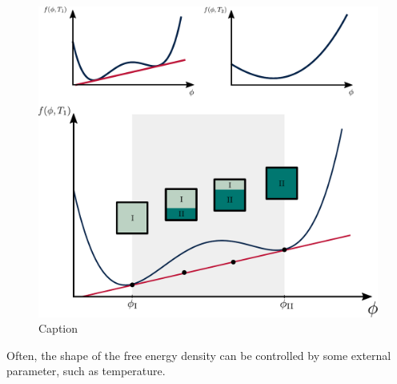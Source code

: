 \begin{figure}
    \centering
    \includegraphics[width=\textwidth]{figures/thermo_solutions.pdf}
    \caption{Caption}
    \label{fig:phase_sep_scheme}
\end{figure}

Often, the shape of the free energy density can be controlled by some external parameter, such as temperature.


